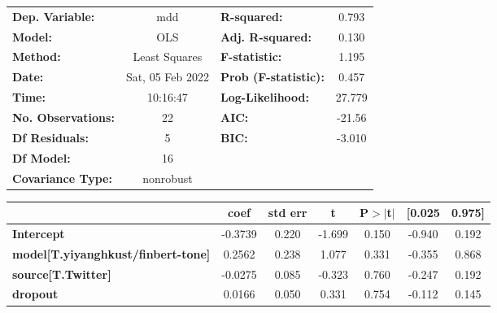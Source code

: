 \begin{center}
\begin{tabular}{lclc}
\toprule
\textbf{Dep. Variable:}                    &       mdd        & \textbf{  R-squared:         } &     0.793   \\
\textbf{Model:}                            &       OLS        & \textbf{  Adj. R-squared:    } &     0.130   \\
\textbf{Method:}                           &  Least Squares   & \textbf{  F-statistic:       } &     1.195   \\
\textbf{Date:}                             & Sat, 05 Feb 2022 & \textbf{  Prob (F-statistic):} &    0.457    \\
\textbf{Time:}                             &     10:16:47     & \textbf{  Log-Likelihood:    } &    27.779   \\
\textbf{No. Observations:}                 &          22      & \textbf{  AIC:               } &    -21.56   \\
\textbf{Df Residuals:}                     &           5      & \textbf{  BIC:               } &    -3.010   \\
\textbf{Df Model:}                         &          16      & \textbf{                     } &             \\
\textbf{Covariance Type:}                  &    nonrobust     & \textbf{                     } &             \\
\bottomrule
\end{tabular}
\begin{tabular}{lcccccc}
                                           & \textbf{coef} & \textbf{std err} & \textbf{t} & \textbf{P$> |$t$|$} & \textbf{[0.025} & \textbf{0.975]}  \\
\midrule
\textbf{Intercept}                         &      -0.3739  &        0.220     &    -1.699  &         0.150        &       -0.940    &        0.192     \\
\textbf{model[T.yiyanghkust/finbert-tone]} &       0.2562  &        0.238     &     1.077  &         0.331        &       -0.355    &        0.868     \\
\textbf{source[T.Twitter]}                 &      -0.0275  &        0.085     &    -0.323  &         0.760        &       -0.247    &        0.192     \\
\textbf{dropout}                           &       0.0166  &        0.050     &     0.331  &         0.754        &       -0.112    &        0.145     \\

\end{tabular}
\end{center}
